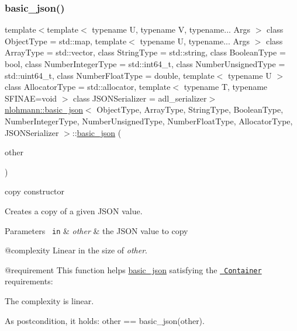 \subsubsection{\texorpdfstring{basic\_json()}{basic\_json()}\hspace{0.1cm}{\footnotesize\ttfamily [8/9]}}
{\footnotesize\ttfamily template$<$template$<$ typename U, typename V, typename... Args $>$ class Object\+Type = std\+::map, template$<$ typename U, typename... Args $>$ class Array\+Type = std\+::vector, class String\+Type  = std\+::string, class Boolean\+Type  = bool, class Number\+Integer\+Type  = std\+::int64\+\_\+t, class Number\+Unsigned\+Type  = std\+::uint64\+\_\+t, class Number\+Float\+Type  = double, template$<$ typename U $>$ class Allocator\+Type = std\+::allocator, template$<$ typename T, typename S\+F\+I\+N\+A\+E=void $>$ class J\+S\+O\+N\+Serializer = adl\+\_\+serializer$>$ \\
\mbox{\hyperlink{classnlohmann_1_1basic__json}{nlohmann\+::basic\+\_\+json}}$<$ Object\+Type, Array\+Type, String\+Type, Boolean\+Type, Number\+Integer\+Type, Number\+Unsigned\+Type, Number\+Float\+Type, Allocator\+Type, J\+S\+O\+N\+Serializer $>$\+::\mbox{\hyperlink{classnlohmann_1_1basic__json}{basic\+\_\+json}} (\begin{DoxyParamCaption}\item[{const \mbox{\hyperlink{classnlohmann_1_1basic__json}{basic\+\_\+json}}$<$ Object\+Type, Array\+Type, String\+Type, Boolean\+Type, Number\+Integer\+Type, Number\+Unsigned\+Type, Number\+Float\+Type, Allocator\+Type, J\+S\+O\+N\+Serializer $>$ \&}]{other }\end{DoxyParamCaption})\hspace{0.3cm}{\ttfamily [inline]}}



copy constructor 

Creates a copy of a given J\+S\+ON value.


\begin{DoxyParams}[1]{Parameters}
\mbox{\texttt{ in}}  & {\em other} & the J\+S\+ON value to copy\\
\hline
\end{DoxyParams}
@complexity Linear in the size of {\itshape other}.

@requirement This function helps {\ttfamily \mbox{\hyperlink{classnlohmann_1_1basic__json}{basic\+\_\+json}}} satisfying the \href{http://en.cppreference.com/w/cpp/concept/Container}{\texttt{ Container}} requirements\+:
\begin{DoxyItemize}
\item The complexity is linear.
\item As postcondition, it holds\+: {\ttfamily other == basic\+\_\+json(other)}.
\end{DoxyItemize}


